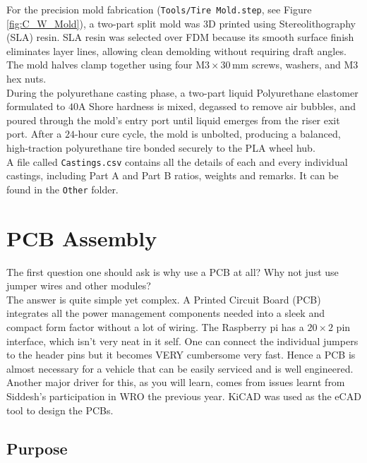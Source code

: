 \documentclass[12pt,a4paper]{article}
\begin{document}
For the precision mold fabrication (\texttt{Tools/Tire Mold.step}, see Figure \ref{fig:C_W_Mold}), a two-part split mold was 3D printed using Stereolithography (SLA) resin. SLA resin was selected over FDM because its smooth surface finish eliminates layer lines, allowing clean demolding without requiring draft angles. The mold halves clamp together using four $\text{M3} \times 30\,\text{mm}$ screws, washers, and $\text{M3}$ hex nuts. \\

During the polyurethane casting phase, a two-part liquid Polyurethane elastomer formulated to $40\text{A}$ Shore hardness is mixed, degassed to remove air bubbles, and poured through the mold's entry port until liquid emerges from the riser exit port. After a $24$-hour cure cycle, the mold is unbolted, producing a balanced, high-traction polyurethane tire bonded securely to the PLA wheel hub. \\

A file called \texttt{Castings.csv} contains all the details of each and every individual castings, including Part A and Part B ratios, weights and remarks. It can be found in the \texttt{Other} folder.

\pagebreak

\section{PCB Assembly}

The first question one should ask is why use a PCB at all? Why not just use jumper wires and other modules? \\

The answer is quite simple yet complex. A Printed Circuit Board (PCB) integrates all the power management components needed into a sleek and compact form factor without a lot of wiring. The Raspberry pi has a $20 \times 2$ pin interface, which isn't very neat in it self. One can connect the individual jumpers to the header pins but it becomes VERY cumbersome very fast. Hence a PCB is almost necessary for a vehicle that can be easily serviced and is well engineered. Another major driver for this, as you will learn, comes from issues learnt from Siddesh's participation in WRO the previous year. KiCAD was used as the eCAD tool to design the PCBs.\\

\subsection{Purpose}
\end{document}
